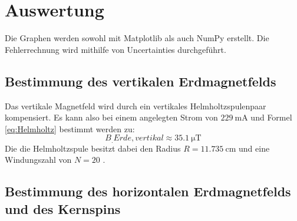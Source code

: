 \section{Auswertung}
\label{sec:Auswertung}

Die Graphen werden sowohl mit Matplotlib \cite{matplotlib} als auch NumPy \cite{numpy} erstellt. Die Fehlerrechnung wird mithilfe von Uncertainties \cite{uncertainties} durchgeführt.

\subsection{Bestimmung des vertikalen Erdmagnetfelds}

Das vertikale Magnetfeld wird durch ein vertikales Helmholtzspulenpaar kompensiert. Es kann also bei einem angelegten Strom von $\SI{229}{\milli\ampere}$ und Formel \ref{eq:Helmholtz} bestimmt werden zu:
\[
B_.{Erde,vertikal} \approx \SI{35.1}{\micro\tesla}
\]
Die die Helmholtzspule besitzt dabei den Radius $R=\SI{11,735}{\centi\metre}$ und eine Windungszahl von $N=20$ \cite{V21}.

\subsection{Bestimmung des horizontalen Erdmagnetfelds und des Kernspins}

